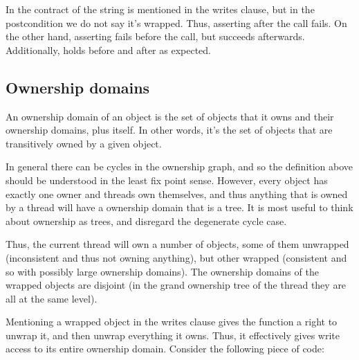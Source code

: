 
\noindent
In the contract of  the string  is mentioned
in the writes clause, but in the postcondition we do not say it's wrapped.
Thus, asserting  after the call fails.
On the other hand, asserting  fails before the call,
but succeeds afterwards.
Additionally,  holds before and after as expected.

%
%
%

\subsection{Ownership domains}

An ownership domain of an object  is the set of objects
that it owns and their ownership domains, plus  itself.
In other words, it's the set of objects that are transitively
owned by a given object.

In general there can be cycles in the ownership graph,
and so the definition above should be understood in the least fix point sense.
However, every object has exactly one owner and threads own themselves,
and thus anything that
is owned by a thread will have a ownership domain that is a tree.
It is most useful to think about ownership as trees, and disregard
the degenerate cycle case.

Thus, the current thread will own a number of objects, some of them
unwrapped (inconsistent and thus not owning anything), but other wrapped (consistent and
so with possibly large ownership domains).
The ownership domains of the wrapped objects are disjoint
(in the grand ownership tree of the thread they are all at the same level).

Mentioning a wrapped object in the writes clause gives the function
a right to unwrap it, and then unwrap everything it owns.
Thus, it effectively gives write access to its entire ownership domain.
Consider the following piece of code:

